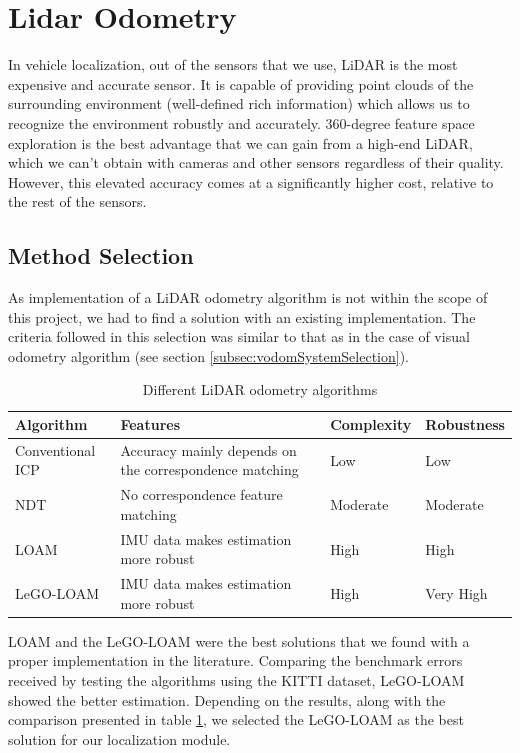 

\section{Lidar Odometry}
In vehicle localization, out of the sensors that we use, \gls{LiDAR} is the most expensive and accurate sensor. It is capable of providing point clouds of the surrounding environment (well-defined rich information) which allows us to recognize the environment robustly and accurately. 360-degree feature space exploration is the best advantage that we can gain from a high-end \gls{LiDAR}, which we can’t obtain with cameras and other sensors regardless of their quality. However, this elevated accuracy comes at a significantly higher cost, relative to the rest of the sensors.

\subsection{Method Selection}
As implementation of a \gls{LiDAR} odometry algorithm is not within the scope of this project, we had to find a solution with an existing implementation. The criteria followed in this selection was similar to that as in the case of visual odometry algorithm (see section \ref{subsec:vodomSystemSelection}). 
\begin{table}[h]
	\centering
	\begin{tabular}{|p{}|p{}|p{}|p{}|} 
		\hline
		\textbf{Algorithm} & \textbf{Features} & \textbf{Complexity} & \textbf{Robustness} \\
		\hline
		Conventional \gls{ICP}&Accuracy mainly depends on the correspondence
		matching&Low&Low\\
		\hline
		\gls{NDT}&No correspondence feature matching&Moderate&Moderate\\
		\hline
		\gls{LOAM}&IMU data makes estimation more robust& High & High\\
		\hline
		\gls{LeGO-LOAM}&IMU data makes estimation more robust& High & Very High\\
		\hline
	\end{tabular}
	\caption{Different \gls{LiDAR} odometry algorithms}
	\label{table:ha:DifferentLOdomMethods}
\end{table}

\gls{LOAM} \cite{hi:LOAM} and the \gls{LeGO-LOAM} \cite{hi:LeGO-LOAM} were the best solutions that we found with a proper implementation in the literature. Comparing the benchmark errors received by testing the algorithms using the \gls{KITTI} dataset, \gls{LeGO-LOAM} showed the better estimation. Depending on the results, along with the comparison presented in table \ref{table:ha:DifferentLOdomMethods}, we selected the \gls{LeGO-LOAM} as the best solution for our localization module.

